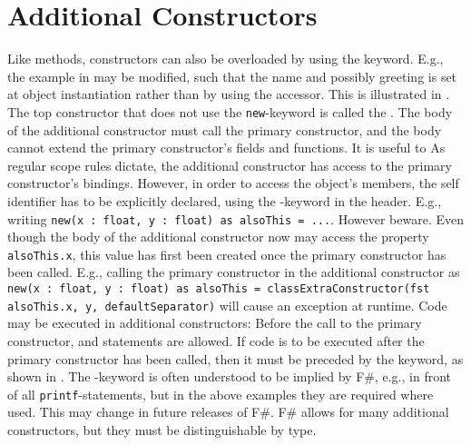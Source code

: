 \section{Additional Constructors}
Like methods, constructors can also be overloaded by using the  keyword. E.g., the example in  may be modified, such that the name and possibly greeting is set at object instantiation rather than by using the accessor. This is illustrated in .
%
%
The top constructor that does not use the \lstinline{new}-keyword is called the . The body of the additional constructor must call the primary constructor, and the body cannot extend the primary constructor's fields and functions. It is useful to  As regular scope rules dictate, the additional constructor has access to the primary constructor's bindings. However, in order to access the object's members, the self identifier has to be explicitly declared, using the -keyword in the header. E.g., writing \lstinline{new(x : float, y : float) as alsoThis = ...}. However beware. Even though the body of the additional constructor now may access the property \lstinline{alsoThis.x}, this value has first been created once the primary constructor has been called. E.g., calling the primary constructor in the additional constructor as \lstinline{new(x : float, y : float) as alsoThis = classExtraConstructor(fst alsoThis.x, y, defaultSeparator)} will cause an exception at runtime. Code may be executed in additional constructors: Before the call to the primary constructor,  and  statements are allowed. If code is to be executed after the primary constructor has been called, then it must be preceded by the  keyword, as shown in .
%
%
The -keyword is often understood to be implied by F\#, e.g., in front of all \lstinline{printf}-statements, but in the above examples they are required where used. This may change in future releases of F\#. F\# allows for many additional constructors, but they must be distinguishable by type.


